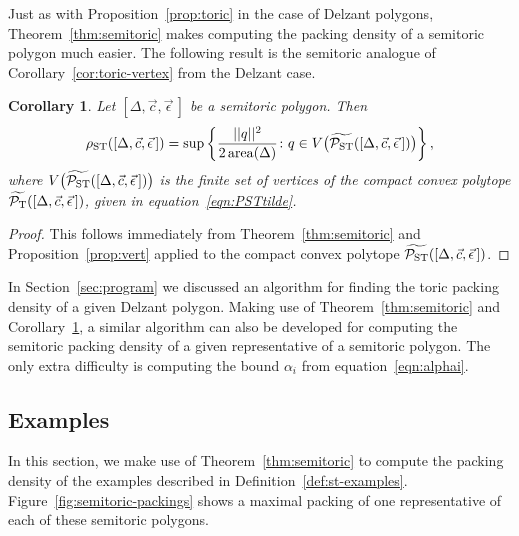 \documentclass[10pt,a4paper]{amsart}
\numberwithin{equation}{section}
\newtheorem{Corollary}[Theorem]{Corollary}
\newcommand{\De}{\Delta}
\newcommand{\area}{\operatorname{area}}
\newcommand{\PT}{\mathcal{P}_{\rm T}}
\newcommand{\PTtilde}{\widetilde{\PT}}
\newcommand{\PSTtilde}{\widetilde{\mathcal{P}_{\rm ST}}}
\newcommand{\stpoly}{[\De,\vec{c},\vec{\epsilon}\,]}
\theoremstyle{definition}
\theoremstyle{plain}
\theoremstyle{plain}
\begin{document}
Just as with Proposition~\ref{prop:toric} in the case of Delzant polygons, Theorem~\ref{thm:semitoric} makes computing the packing density of a semitoric polygon much easier.
The following result is the semitoric analogue of Corollary~\ref{cor:toric-vertex} from the Delzant case.



\begin{Corollary} \label{cor:semitoric-vertex}
 Let $\stpoly$ be a semitoric polygon.
 Then
 \[
 \rho_{{\rm ST}} (\stpoly) = \sup \left\{ \frac{||q||^2}{2 \area(\De)}\colon q\in V\big(\PSTtilde(\stpoly)\big)\right\},
 \]
 where $V\big(\PSTtilde(\stpoly)\big)$ is the finite set of vertices of the compact convex polytope $\PTtilde(\stpoly)$, given in equation~\eqref{eqn:PSTtilde}.
 \end{Corollary}

\begin{proof}This follows immediately from Theorem~\ref{thm:semitoric} and Proposition~\ref{prop:vert} applied to the compact convex polytope $\PSTtilde(\stpoly)$.
\end{proof}

\begin{Remark}
 In Section~\ref{sec:program} we discussed an algorithm for finding the toric packing density of a given Delzant polygon.
 Making use of Theorem~\ref{thm:semitoric} and Corollary~\ref{cor:semitoric-vertex}, a similar algorithm can also be developed for computing the semitoric packing density of a given representative of a semitoric polygon.
 The only extra difficulty is computing the bound $\alpha_i$ from equation~\eqref{eqn:alphai}.
\end{Remark}







\subsection{Examples}\label{sec:pack-st-examples}
In this section, we make use of Theorem~\ref{thm:semitoric} to compute the packing density of the examples described in Definition~\ref{def:st-examples}.
Figure~\ref{fig:semitoric-packings} shows a maximal packing of one representative of each of these semitoric polygons.
\end{document}
